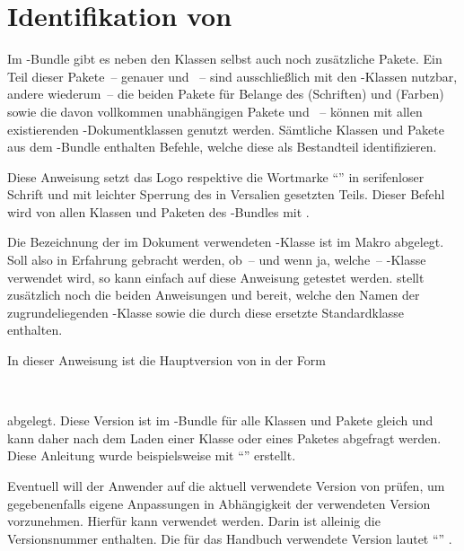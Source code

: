 \chapter{Identifikation von \TUDScript}
Im \TUDScript-Bundle gibt es neben den Klassen selbst auch noch zusätzliche 
Pakete. Ein Teil dieser Pakete~-- genauer  und 
~-- sind ausschließlich mit den \TUDScript-Klassen nutzbar, 
andere wiederum~-- die beiden Pakete für Belange des \CDs {} 
(Schriften) und  (Farben) sowie die davon vollkommen 
unabhängigen Pakete  und ~-- können mit 
allen existierenden -Dokumentklassen genutzt werden. Sämtliche 
Klassen und Pakete aus dem \TUDScript-Bundle enthalten Befehle, welche diese 
als Bestandteil identifizieren.

\begin{Declaration}[v2.04]{}
\printdeclarationlist%
%
Diese Anweisung setzt das Logo respektive die Wortmarke \enquote{\TUDScript{}} 
in serifenloser Schrift und mit leichter Sperrung des in Versalien gesetzten 
Teils. Dieser Befehl wird von allen Klassen und Paketen des \TUDScript-Bundles 
mit .
\end{Declaration}

\begin{Declaration}[v2.04]{}
\printdeclarationlist%
%
Die Bezeichnung der im Dokument verwendeten \TUDScript-Klasse ist im Makro 
 abgelegt. Soll also in Erfahrung gebracht werden, 
ob~-- und wenn ja, welche~-- \TUDScript-Klasse verwendet wird, so kann einfach 
auf diese Anweisung getestet werden. \KOMAScript{} stellt zusätzlich noch die 
beiden Anweisungen  und  bereit, welche 
den Namen der zugrundeliegenden \KOMAScript-Klasse sowie die durch diese 
ersetzte Standardklasse enthalten.
\end{Declaration}

\begin{Declaration}[v2.04]{}
\begin{Declaration}[v2.05]{}
\printdeclarationlist%
%
In dieser Anweisung ist die Hauptversion von \TUDScript in der Form
\begin{quoting}
~~
\end{quoting}
abgelegt. Diese Version ist im \TUDScript-Bundle für alle Klassen und Pakete 
gleich und kann daher nach dem Laden einer Klasse oder eines Paketes abgefragt 
werden. Diese Anleitung wurde beispielsweise mit \enquote{\TUDScriptVersion{}} 
erstellt.

Eventuell will der Anwender auf die aktuell verwendete Version von \TUDScript 
prüfen, um gegebenenfalls eigene Anpassungen in Abhängigkeit der verwendeten 
Version vorzunehmen. Hierfür kann  verwendet 
werden. Darin ist alleinig die Versionsnummer enthalten. Die für das Handbuch 
verwendete Version lautet \enquote{\TUDScriptVersionNumber{}} .
\end{Declaration}
\end{Declaration}
